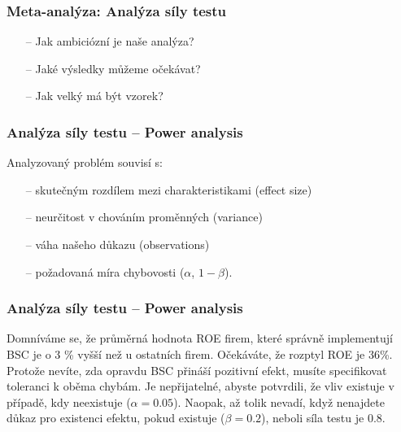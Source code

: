 \documentclass[10pt,xcolor={dvipsnames}]{beamer}
\begin{document}

\begin{frame}
\frametitle{Meta-analýza: Analýza síly testu}
\begin{Large}
\begin{itemize}
\item[--] Jak ambiciózní je naše analýza?
\item[--] Jaké výsledky můžeme očekávat?
\item[--] Jak velký má být vzorek?
\end{itemize}
\end{Large}
\end{frame}


\begin{frame}
\frametitle{Analýza síly testu -- Power analysis}
\begin{large}
Analyzovaný problém souvisí s:
\begin{itemize}
\item[--] skutečným rozdílem mezi charakteristikami (effect size)
\item[--] neurčitost v chováním proměnných (variance)
\item[--] váha našeho důkazu (observations)
\item[--] požadovaná míra chybovosti ($\alpha$, $1-\beta$).
\end{itemize}
\end{large}
\end{frame}


\begin{frame}
\frametitle{Analýza síly testu -- Power analysis}
\begin{large}
Domníváme se, že průměrná hodnota ROE firem, které správně implementují BSC je \textcolor{NavyBlue}{o 3 \%} vyšší než u ostatních firem. Očekáváte, že \textcolor{NavyBlue}{rozptyl ROE je 36\%}. Protože nevíte, zda opravdu BSC přináší pozitivní efekt, musíte specifikovat toleranci k oběma chybám. Je nepřijatelné, abyste potvrdili, že vliv existuje v případě, kdy \textcolor{WildStrawberry}{neexistuje ($\alpha=0.05$)}. Naopak, až tolik nevadí, když nenajdete důkaz pro existenci efektu, \textcolor{WildStrawberry}{pokud existuje ($\beta = 0.2$), neboli síla testu je 0.8}. \newline\smallskip

\end{large}

\end{frame}
\end{document}
